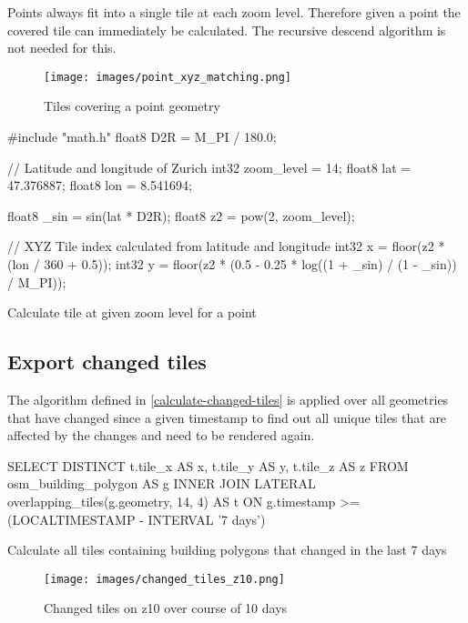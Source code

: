 Points always fit into a single tile at each zoom level.
Therefore given a point the covered tile can immediately be calculated. The recursive descend algorithm is not needed for this.

\begin{figure}[H]
  \centering
  \texttt{[image: images/point\_xyz\_matching.png]}
  \caption{Tiles covering a point geometry}
\end{figure}


\begin{listing}[H]
  \centering
  \begin{ccode}
#include "math.h"
float8 D2R = M_PI / 180.0;

// Latitude and longitude of Zurich
int32 zoom_level = 14;
float8 lat = 47.376887;
float8 lon = 8.541694;

float8 _sin = sin(lat * D2R);
float8 z2 = pow(2, zoom_level);

// XYZ Tile index calculated from latitude and longitude
int32 x = floor(z2 * (lon / 360 + 0.5));
int32 y = floor(z2 * (0.5 - 0.25 * log((1 + _sin) / (1 - _sin)) / M_PI));

  \end{ccode}
  \caption{Calculate tile at given zoom level for a point}
\end{listing}

\subsection{Export changed tiles}

The algorithm defined in \autoref{calculate-changed-tiles} is applied over all geometries that have changed since a given timestamp to find out all unique tiles that are affected by the changes and need to be rendered again.

\begin{listing}[H]
  \centering
  \begin{sqlcode}
    SELECT DISTINCT t.tile_x AS x, t.tile_y AS y, t.tile_z AS z
    FROM osm_building_polygon AS g
    INNER JOIN LATERAL overlapping_tiles(g.geometry, 14, 4) AS t
    ON g.timestamp >= (LOCALTIMESTAMP - INTERVAL '7 days')
  \end{sqlcode}
  \caption{Calculate all tiles containing building polygons that changed in the last 7 days}
\end{listing}

\begin{figure}[H]
  \centering
  \texttt{[image: images/changed\_tiles\_z10.png]}
  \caption{Changed tiles on z10 over course of 10 days}
\end{figure}
